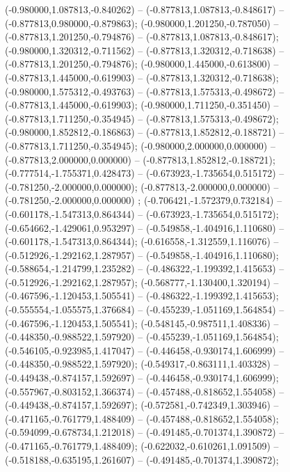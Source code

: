 (-0.980000,1.087813,-0.840262) -- (-0.877813,1.087813,-0.848617) -- (-0.877813,0.980000,-0.879863);
 (-0.980000,1.201250,-0.787050) -- (-0.877813,1.201250,-0.794876) -- (-0.877813,1.087813,-0.848617);
 (-0.980000,1.320312,-0.711562) -- (-0.877813,1.320312,-0.718638) -- (-0.877813,1.201250,-0.794876);
 (-0.980000,1.445000,-0.613800) -- (-0.877813,1.445000,-0.619903) -- (-0.877813,1.320312,-0.718638);
 (-0.980000,1.575312,-0.493763) -- (-0.877813,1.575313,-0.498672) -- (-0.877813,1.445000,-0.619903);
 (-0.980000,1.711250,-0.351450) -- (-0.877813,1.711250,-0.354945) -- (-0.877813,1.575313,-0.498672);
 (-0.980000,1.852812,-0.186863) -- (-0.877813,1.852812,-0.188721) -- (-0.877813,1.711250,-0.354945);
 (-0.980000,2.000000,0.000000) -- (-0.877813,2.000000,0.000000) -- (-0.877813,1.852812,-0.188721);
 (-0.777514,-1.755371,0.428473) -- (-0.673923,-1.735654,0.515172) -- (-0.781250,-2.000000,0.000000);
 (-0.877813,-2.000000,0.000000) -- (-0.781250,-2.000000,0.000000) ;
 (-0.706421,-1.572379,0.732184) -- (-0.601178,-1.547313,0.864344) -- (-0.673923,-1.735654,0.515172);
 (-0.654662,-1.429061,0.953297) -- (-0.549858,-1.404916,1.110680) -- (-0.601178,-1.547313,0.864344);
 (-0.616558,-1.312559,1.116076) -- (-0.512926,-1.292162,1.287957) -- (-0.549858,-1.404916,1.110680);
 (-0.588654,-1.214799,1.235282) -- (-0.486322,-1.199392,1.415653) -- (-0.512926,-1.292162,1.287957);
 (-0.568777,-1.130400,1.320194) -- (-0.467596,-1.120453,1.505541) -- (-0.486322,-1.199392,1.415653);
 (-0.555554,-1.055575,1.376684) -- (-0.455239,-1.051169,1.564854) -- (-0.467596,-1.120453,1.505541);
 (-0.548145,-0.987511,1.408336) -- (-0.448350,-0.988522,1.597920) -- (-0.455239,-1.051169,1.564854);
 (-0.546105,-0.923985,1.417047) -- (-0.446458,-0.930174,1.606999) -- (-0.448350,-0.988522,1.597920);
 (-0.549317,-0.863111,1.403328) -- (-0.449438,-0.874157,1.592697) -- (-0.446458,-0.930174,1.606999);
 (-0.557967,-0.803152,1.366374) -- (-0.457488,-0.818652,1.554058) -- (-0.449438,-0.874157,1.592697);
 (-0.572581,-0.742349,1.303946) -- (-0.471165,-0.761779,1.488409) -- (-0.457488,-0.818652,1.554058);
 (-0.594099,-0.678734,1.212018) -- (-0.491485,-0.701374,1.390872) -- (-0.471165,-0.761779,1.488409);
 (-0.622032,-0.610261,1.091509) -- (-0.518188,-0.635195,1.261607) -- (-0.491485,-0.701374,1.390872);

